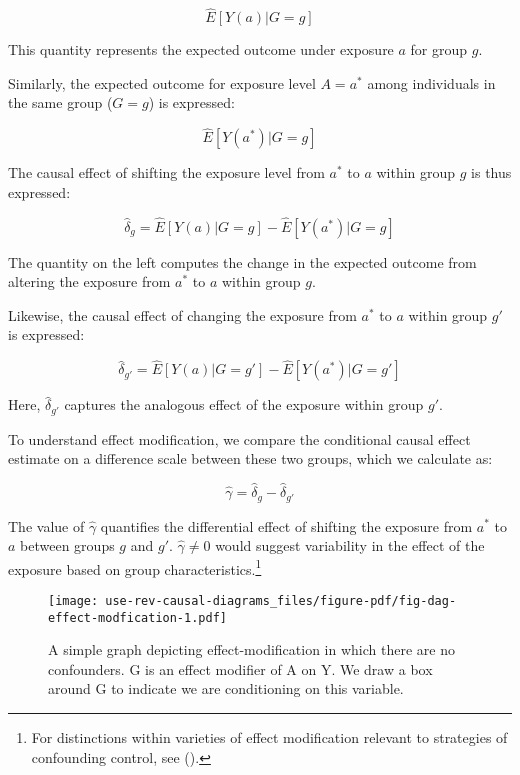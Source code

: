 \documentclass[
  singlecolumn,
  9pt]{article}
\begin{document}
\[\hat{E}[Y(a)|G=g]\]

This quantity represents the expected outcome under exposure \(a\) for
group \(g\).

Similarly, the expected outcome for exposure level \(A = a^*\) among
individuals in the same group (\(G = g\)) is expressed:

\[\hat{E}[Y(a^*)|G=g]\]

The causal effect of shifting the exposure level from \(a^*\) to \(a\)
within group \(g\) is thus expressed:

\[\hat{\delta}_g = \hat{E}[Y(a)|G=g] - \hat{E}[Y(a^*)|G=g]\]

The quantity on the left computes the change in the expected outcome
from altering the exposure from \(a^*\) to \(a\) within group \(g\).

Likewise, the causal effect of changing the exposure from \(a^*\) to
\(a\) within group \(g'\) is expressed:

\[\hat{\delta}_{g'} = \hat{E}[Y(a)|G=g'] - \hat{E}[Y(a^*)|G=g']\]

Here, \(\hat{\delta}_{g'}\) captures the analogous effect of the
exposure within group \(g'\).

To understand effect modification, we compare the conditional causal
effect estimate on a difference scale between these two groups, which we
calculate as:

\[\hat{\gamma} = \hat{\delta}_g - \hat{\delta}_{g'}\]

The value of \(\hat{\gamma}\) quantifies the differential effect of
shifting the exposure from \(a^*\) to \(a\) between groups \(g\) and
\(g'\). \(\hat{\gamma} \neq 0\) would suggest variability in the effect
of the exposure based on group characteristics.\footnote{For
  distinctions within varieties of effect modification relevant to
  strategies of confounding control, see
  ().}

\begin{figure}

{\centering \texttt{[image: use-rev-causal-diagrams\_files/figure-pdf/fig-dag-effect-modfication-1.pdf]}

}

\caption{\label{fig-dag-effect-modfication}A simple graph depicting
effect-modification in which there are no confounders. G is an effect
modifier of A on Y. We draw a box around G to indicate we are
conditioning on this variable.}

\end{figure}
\end{document}
